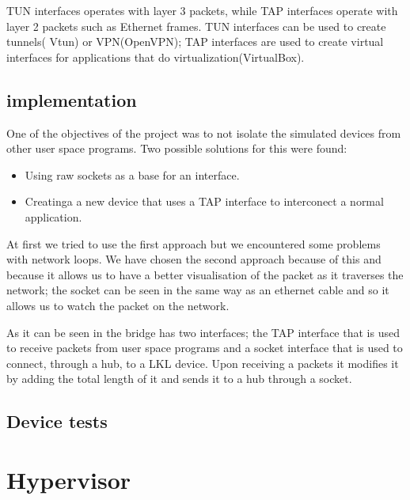 \lstset{language=C,caption=Opening a tun/tap interface,label=lst:tapopen}


TUN interfaces operates with layer 3 packets, while TAP interfaces operate with layer 
2 packets such as Ethernet frames. TUN interfaces can be used to create tunnels( Vtun)
or VPN(OpenVPN); TAP interfaces are used to create virtual interfaces for applications 
that do virtualization(VirtualBox).

\subsection{\text{\project} implementation}
\label{sub-sec:bridge-lkl}

One of the objectives of the project was to not isolate the simulated devices from other user space 
programs. Two possible solutions for this were found:
\begin{itemize}
  \item Using raw sockets as a base for an interface.
  \item Creatinga a new device that uses a TAP interface to interconect a normal application.
\end{itemize}

At first we tried to use the first approach but we encountered some problems with network loops.
We have chosen the second approach because of this and because it allows us to have a better visualisation of the packet
as it traverses the network; the socket can be seen in the same way as an ethernet cable and so it allows
us to watch the packet on the network.


As it can be seen in  the bridge has two interfaces; the TAP interface that is used to 
receive packets from user space programs and a socket interface that is used to connect, through a hub, to 
a LKL device. Upon receiving a packets it modifies it by adding the total length of it and sends it to a hub 
through a socket.

\subsection{Device tests}
\label{sub-sec:bridge-tests}

\section{Hypervisor}
\label{sec:hypervisor2}

